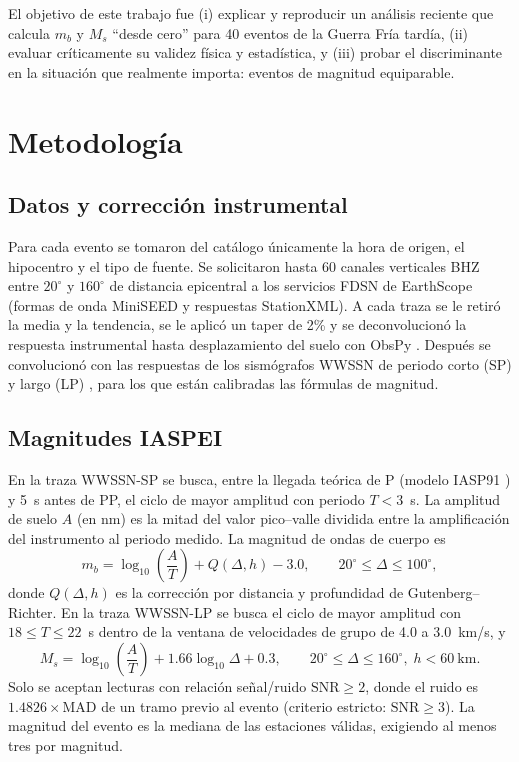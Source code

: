 \documentclass[letterpaper,12pt]{article}
\begin{document}
El objetivo de este trabajo fue (i) explicar y reproducir un análisis reciente que calcula $m_b$ y $M_s$ ``desde cero'' para 40 eventos de la Guerra Fría tardía, (ii) evaluar críticamente su validez física y estadística, y (iii) probar el discriminante en la situación que realmente importa: eventos de magnitud equiparable.

\section*{Metodología}

\subsection*{Datos y corrección instrumental}
Para cada evento se tomaron del catálogo únicamente la hora de origen, el hipocentro y el tipo de fuente. Se solicitaron hasta 60 canales verticales BHZ entre $20^\circ$ y $160^\circ$ de distancia epicentral a los servicios FDSN de EarthScope (formas de onda MiniSEED y respuestas StationXML). A cada traza se le retiró la media y la tendencia, se le aplicó un taper de 2\% y se deconvolucionó la respuesta instrumental hasta desplazamiento del suelo con ObsPy \cite{obspy}. Después se convolucionó con las respuestas de los sismógrafos WWSSN de periodo corto (SP) y largo (LP) \cite{iaspei}, para los que están calibradas las fórmulas de magnitud.

\subsection*{Magnitudes IASPEI}
En la traza WWSSN-SP se busca, entre la llegada teórica de P (modelo IASP91 \cite{iasp91}) y 5~s antes de PP, el ciclo de mayor amplitud con periodo $T<3$~s. La amplitud de suelo $A$ (en nm) es la mitad del valor pico--valle dividida entre la amplificación del instrumento al periodo medido. La magnitud de ondas de cuerpo es \cite{iaspei,gutenberg}
\begin{equation}
  m_b=\log_{10}\!\left(\frac{A}{T}\right)+Q(\Delta,h)-3.0,\qquad 20^\circ\leq\Delta\leq100^\circ,
  \label{eq:mb}
\end{equation}
donde $Q(\Delta,h)$ es la corrección por distancia y profundidad de Gutenberg--Richter. En la traza WWSSN-LP se busca el ciclo de mayor amplitud con $18\leq T\leq22$~s dentro de la ventana de velocidades de grupo de 4.0 a 3.0~km/s, y \cite{iaspei,vanek}
\begin{equation}
  M_s=\log_{10}\!\left(\frac{A}{T}\right)+1.66\log_{10}\Delta+0.3,\qquad 20^\circ\leq\Delta\leq160^\circ,\; h<60~\text{km}.
  \label{eq:ms}
\end{equation}
Solo se aceptan lecturas con relación señal/ruido $\text{SNR}\geq2$, donde el ruido es $1.4826\times\text{MAD}$ de un tramo previo al evento (criterio estricto: $\text{SNR}\geq3$). La magnitud del evento es la mediana de las estaciones válidas, exigiendo al menos tres por magnitud.
\end{document}
